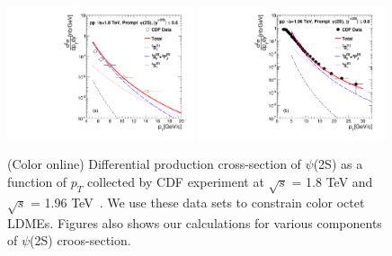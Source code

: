\documentclass[aps,prc,preprint,superscriptaddress,showpacs,showkeys,amsmath]{revtex4-1}
\begin{document}
\begin{figure}
\includegraphics[width=0.49\textwidth]{Figures/Psi2S/Psi2S_CDF_180TeV.pdf}
\includegraphics[width=0.49\textwidth]{Figures/Psi2S/Psi2S_CDF_196TeV.pdf}
\caption{(Color online) Differential production cross-section of $\psi$(2S) as a function of $p_{T}$ 
collected by CDF experiment at $\sqrt{s}$ = 1.8 TeV and $\sqrt{s}$ = 1.96 TeV~\cite{Acosta:2004yw}. 
We use these data sets to constrain color octet LDMEs. Figures also shows our calculations for various components 
of $\psi$(2S) croos-section.}
\label{Fig:LDMEJPsiCDF}
\end{figure}
\end{document}

